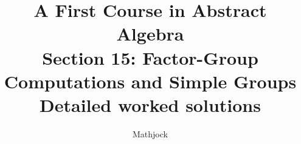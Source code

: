 
\title{\textbf{A First Course in Abstract Algebra}\\[0.3em]Section 15: Factor-Group Computations and Simple Groups\\[0.3em]\large Detailed worked solutions}
\author{Mathjock}
\date{}

\maketitle
\bookinfo
\tableofcontents
\clearpage
\renewcommand{\thesection}{15}
\renewcommand{\theHsection}{fraleigh.15}


